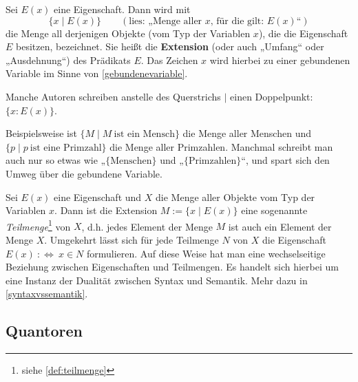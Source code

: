 \begin{nota} \label{extensionimlogikkapitel}
    Sei $E(x)$ eine Eigenschaft. Dann wird mit
        \[ \{ x\mid E(x) \} \qquad (\text{lies: „Menge aller $x$, für die gilt: $E(x)$“})\]
    die Menge all derjenigen Objekte (vom Typ der Variablen $x$), die die Eigenschaft $E$ besitzen, bezeichnet. Sie heißt die \textbf{Extension} (oder auch „Umfang“ oder „Ausdehnung“) des Prädikats $E$. Das Zeichen $x$ wird hierbei zu einer gebundenen Variable im Sinne von \cref{gebundenevariable}.

    Manche Autoren schreiben anstelle des Querstrichs $\vert$ einen Doppelpunkt: $\{x: E(x) \}$.
\end{nota}


\begin{bsp}
    Beispielsweise ist $\{M\mid M\ \text{ist ein Mensch}\}$ die Menge aller Menschen und $\{p\mid p\ \text{ist eine Primzahl}\}$ die Menge aller Primzahlen. Manchmal schreibt man auch nur so etwas wie „$\{\text{Menschen}\}$ und „$\{\text{Primzahlen}\}$“, und spart sich den Umweg über die gebundene Variable.
\end{bsp}


\begin{bem} \label{mengenvseig}
    Sei $E(x)$ eine Eigenschaft und $X$ die Menge aller Objekte vom Typ der Variablen $x$. Dann ist die Extension $M:=\{x\mid E(x)\}$ eine sogenannte \emph{Teilmenge}\footnote{siehe \cref{def:teilmenge}} von $X$, d.h. jedes Element der Menge $M$ ist auch ein Element der Menge $X$. Umgekehrt lässt sich für jede Teilmenge $N$ von $X$ die Eigenschaft $E(x)\ :\Leftrightarrow\ x\in N$ formulieren. Auf diese Weise hat man eine wechselseitige Beziehung zwischen Eigenschaften und Teilmengen. Es handelt sich hierbei um eine Instanz der Dualität zwischen Syntax und Semantik. Mehr dazu in \cref{syntaxvssemantik}.
\end{bem}





\subsection*{Quantoren}


